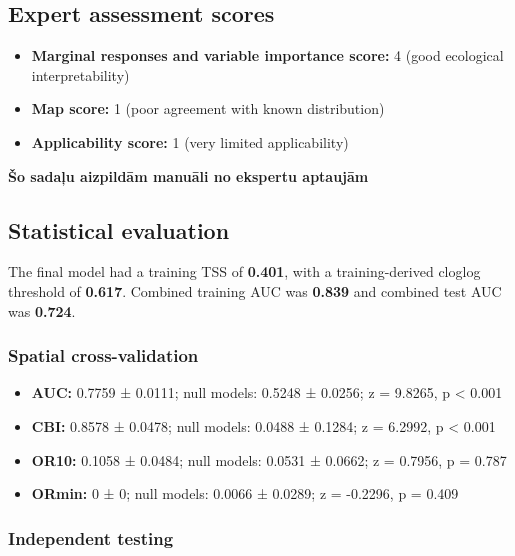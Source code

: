 \documentclass[
  openany]{book}
\providecommand{\tightlist}{%
  \setlength{\itemsep}{0pt}\setlength{\parskip}{0pt}}
\providecommand{\tightlist}{%
  \setlength{\itemsep}{0pt}%
  \setlength{\parskip}{0pt}%
}
\begin{document}
\subsection*{Expert assessment scores}\label{expert-assessment-scores-8}

\begin{itemize}
\tightlist
\item
  \textbf{Marginal responses and variable importance score:} 4 (good ecological interpretability)
\item
  \textbf{Map score:} 1 (poor agreement with known distribution)
\item
  \textbf{Applicability score:} 1 (very limited applicability)
\end{itemize}

\textbf{Šo sadaļu aizpildām manuāli no ekspertu aptaujām}

\subsection*{Statistical evaluation}\label{statistical-evaluation-8}

The final model had a training TSS of \textbf{0.401}, with a training-derived cloglog threshold of \textbf{0.617}. Combined training AUC was \textbf{0.839} and combined test AUC was \textbf{0.724}.

\subsubsection*{Spatial cross-validation}\label{spatial-cross-validation-8}

\begin{itemize}
\tightlist
\item
  \textbf{AUC:} 0.7759 ± 0.0111; null models: 0.5248 ± 0.0256; z = 9.8265, p \textless{} 0.001
\item
  \textbf{CBI:} 0.8578 ± 0.0478; null models: 0.0488 ± 0.1284; z = 6.2992, p \textless{} 0.001
\item
  \textbf{OR10:} 0.1058 ± 0.0484; null models: 0.0531 ± 0.0662; z = 0.7956, p = 0.787
\item
  \textbf{ORmin:} 0 ± 0; null models: 0.0066 ± 0.0289; z = -0.2296, p = 0.409
\end{itemize}

\subsubsection*{Independent testing}\label{independent-testing-8}
\end{document}
